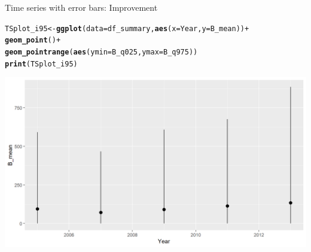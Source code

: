 \documentclass{beamer}\usepackage[]{graphicx}\usepackage[]{color}
\makeatletter
\newcommand{\hlopt}[1]{\textcolor[rgb]{0,0,0}{#1}}%
\newcommand{\hlstd}[1]{\textcolor[rgb]{0.345,0.345,0.345}{#1}}%
\newcommand{\hlkwb}[1]{\textcolor[rgb]{0.69,0.353,0.396}{#1}}%
\newcommand{\hlkwc}[1]{\textcolor[rgb]{0.333,0.667,0.333}{#1}}%
\newcommand{\hlkwd}[1]{\textcolor[rgb]{0.737,0.353,0.396}{\textbf{#1}}}%
\newenvironment{kframe}{%
 \def\at@end@of@kframe{}%
 \ifinner\ifhmode%
  \def\at@end@of@kframe{\end{minipage}}%
  \begin{minipage}{\columnwidth}%
 \fi\fi%
 \def\FrameCommand##1{\hskip\@totalleftmargin \hskip-\fboxsep
 \colorbox{shadecolor}{##1}\hskip-\fboxsep
     \hskip-\linewidth \hskip-\@totalleftmargin \hskip\columnwidth}%
 \MakeFramed {\advance\hsize-\width
   \@totalleftmargin\z@ \linewidth\hsize
   \@setminipage}}%
 {\par\unskip\endMakeFramed%
 \at@end@of@kframe}
\newenvironment{knitrout}{}{} %
\makeatother
\begin{document}
\begin{frame}[fragile]{Time series with error bars: Improvement}
\begin{knitrout}\footnotesize
{}\color{fgcolor}\begin{kframe}
\begin{alltt}
\hlstd{TSplot_i95} \hlkwb{<-} \hlkwd{ggplot}\hlstd{(}\hlkwc{data}\hlstd{=df_summary,} \hlkwd{aes}\hlstd{(}\hlkwc{x}\hlstd{=Year,} \hlkwc{y}\hlstd{=B_mean))} \hlopt{+}
  \hlkwd{geom_point}\hlstd{()} \hlopt{+}
  \hlkwd{geom_pointrange}\hlstd{(}\hlkwd{aes}\hlstd{(}\hlkwc{ymin} \hlstd{= B_q025,} \hlkwc{ymax} \hlstd{= B_q975))}
\hlkwd{print}\hlstd{(TSplot_i95)}
\end{alltt}
\end{kframe}

{\centering \includegraphics[width=.9\linewidth]{figure/sp_TSplot_i95_bis-1} 

}



\end{knitrout}
\end{frame}
\end{document}
